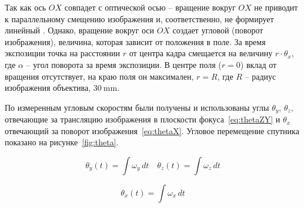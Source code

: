  Так как ось $OX$ совпадет с оптической осью -- вращение вокруг $OX$ не приводит к параллельному смещению изображения и, соответственно, не формирует линейный \blur{}. Однако, вращение вокруг оси $OX$ создает угловой \blur{} (поворот изображения), величина, которая зависит от положения в поле. За время экспозиции точка на расстоянии $r$ от центра кадра смещается на величину $r\cdot \theta_x$, где $\alpha$ -- угол поворота за время экспозиции. В центре поля ($r=0$) вклад от вращения отсутствует, на краю поля он максимален, $r=R$, где $R$ -- радиус изображения объектива, $\SI{30}{\milli\meter}$.
 
 По измеренным угловым скоростям были получены и использованы углы $\theta_y$, $\theta_z$, отвечающие за трансляцию изображения в плоскости фокуса~\eqref{eq:thetaZY} и $\theta_x$ отвечающий за поворот изображения~\eqref{eq:thetaX}. Угловое перемещение спутника показано на рисунке~\cref{fig:theta}.
 
 \begin{equation}
 	\label{eq:thetaZY}
 	\theta_{y}(t)= \int \omega_{y}\, dt \quad \theta_z(t) = \int \omega_z\,dt
 \end{equation}
 
 \begin{equation}
 	\label{eq:thetaX}
 	\theta_{x}(t)= \int \omega_{x}\, dt 
 \end{equation}
 
